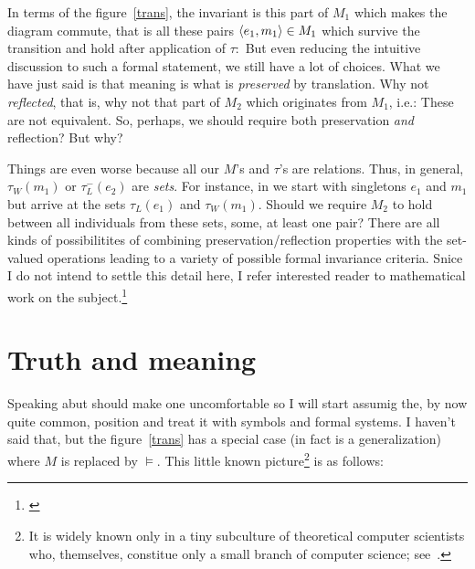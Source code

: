 \documentclass[10pt]{article}
\begin{document}
In terms of the 
figure~\ref{trans}, the invariant is this part of $M_1$ which makes the 
diagram commute, that is all these pairs $\langle e_1,m_1\rangle\in M_1$ which survive the 
transition and hold after application of $\tau:$ 
But even reducing the intuitive discussion to such 
a formal statement, we still have a lot of choices. What we have just said 
is that meaning is what is {\em preserved} by translation. Why not {\em 
reflected}, that is, why not that part of $M_2$ which originates from $M_1$, i.e.:
These are not equivalent. So, perhaps, we should require both 
preservation {\em and} reflection? But why?

Things are even worse because all our $M$'s and $\tau$'s are 
relations. Thus, in general, $\tau_W(m_1)$ or $\tau_L^-(e_2)$ are {\em 
sets}. For instance, in  we start with singletons $e_1$ and 
$m_1$ but arrive at the sets $\tau_L(e_1)$ and $\tau_W(m_1)$. Should we 
require $M_2$ to hold between all individuals from these sets, some, at 
least one pair?
There are all kinds of possibilitites of combining 
preservation/reflection properties with the set-valued operations leading 
to a variety of possible formal invariance criteria. Snice I do not intend 
to settle this detail here, I refer interested reader to mathematical work 
on the subject.\footnote{\cite{Koh, Brink, WB}}

\section{Truth and meaning}
Speaking abut  should make one uncomfortable so I will start 
assumig the, by now quite common, position and treat it with symbols and 
formal systems. I haven't said that, but the figure~\ref{trans} has a 
special case (in fact is a generalization) where 
 $M$ is replaced by $\models$. This little known picture\footnote{It is 
widely known only in a tiny subculture of theoretical computer scientists 
who, themselves, constitue only a small branch of computer science; see~\cite{Inst}.} 
is as 
follows:
\end{document}
